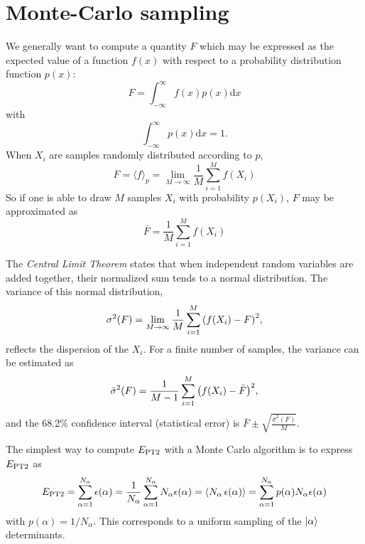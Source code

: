 \documentclass[./thesis.tex]{subfiles}
\begin{document}
\section{Monte-Carlo sampling}

We generally want to compute a quantity $F$ which may be expressed as the expected value of a function $f(x)$ with respect to a probability distribution function $p(x)$:
\begin{equation}
F = \int_{-\infty}^\infty f(x) p(x) \text{d} x
\end{equation}
with 
\begin{equation}
\int_{-\infty}^\infty p(x) \text{d} x = 1.
\end{equation}
When $X_i$ are samples randomly distributed according to $p$, 
\begin{equation}
\label{eq:sum_mc}
F = \langle f \rangle_p =  \lim_{M\rightarrow \infty} \frac{1}{M} \sum_{i=1}^{M} f(X_i)
\end{equation}
So if one is able to draw $M$ samples $X_i$ with probability $p(X_i)$, $F$ may be approximated as
\begin{equation}
\bar{F} = \frac{1}{M} \sum_{i=1}^{M} f(X_i)
\end{equation}

The \emph{Central Limit Theorem} states that when independent random variables are added together, their normalized sum tends to a normal distribution. The variance of this normal distribution, 
\begin{equation}
\sigma^2(F) = \lim_{M\rightarrow \infty} \frac{1}{M} \sum_{i=1}^{M} \qty( f(X_i) - F)^2,
\end{equation}
reflects the dispersion of the $X_i$.
For a finite number of samples, the variance can be estimated as
\begin{equation}
\bar{\sigma}^2(F) = \frac{1}{M-1} \sum_{i=1}^{M} \qty( f(X_i) - \bar{F})^2,
\end{equation}
and the 68.2\% confidence interval (statistical error) is $\bar{F} \pm \sqrt{\frac{\bar{\sigma}^2(F)}{M}}$.

The simplest way to compute $E_\text{PT2}$ with a Monte Carlo algorithm is to express $E_\text{PT2}$ as
\begin{equation}
\EPT %
= \sum_{\alpha = 1}^{N_\alpha} \epsilon(\alpha)
= \frac{1}{N_\alpha} \sum_{\alpha = 1}^{N_\alpha} N_\alpha \epsilon(\alpha)
= \langle N_\alpha\, \epsilon(\alpha) \rangle
= \sum_{\alpha = 1}^{N_\alpha} p(\alpha) N_\alpha \epsilon(\alpha) 
\end{equation}
with $p(\alpha) = 1 / N_\alpha$. This corresponds to a uniform sampling of the ${\ket{\alpha}}$ determinants.
\end{document}
